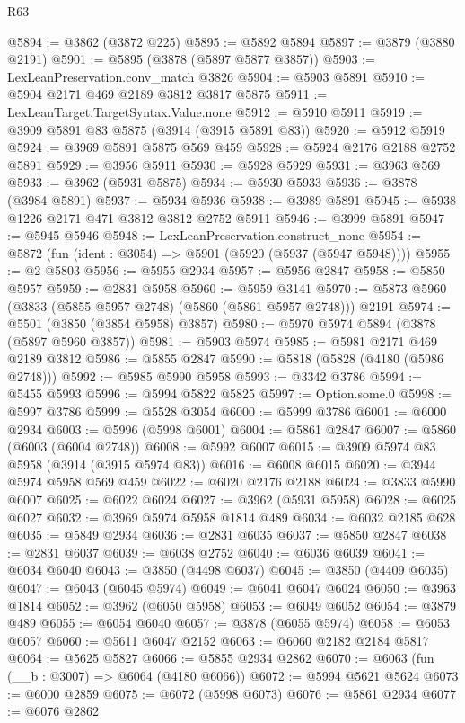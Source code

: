 \begin{lexlean}{R63}
\begin{coremodule}
@5894 := @3862 (@3872 @225)
@5895 := @5892 @5894
@5897 := @3879 (@3880 @2191)
@5901 := @5895 (@3878 (@5897 @5877 @3857))
@5903 := LexLeanPreservation.conv_match @3826
@5904 := @5903 @5891
@5910 := @5904 @2171 @469 @2189 @3812 @3817 @5875
@5911 := LexLeanTarget.TargetSyntax.Value.none
@5912 := @5910 @5911
@5919 := @3909 @5891 @83 @5875 (@3914 (@3915 @5891 @83))
@5920 := @5912 @5919
@5924 := @3969 @5891 @5875 @569 @459
@5928 := @5924 @2176 @2188 @2752 @5891
@5929 := @3956 @5911
@5930 := @5928 @5929
@5931 := @3963 @569
@5933 := @3962 (@5931 @5875)
@5934 := @5930 @5933
@5936 := @3878 (@3984 @5891)
@5937 := @5934 @5936
@5938 := @3989 @5891
@5945 := @5938 @1226 @2171 @471 @3812 @3812 @2752 @5911
@5946 := @3999 @5891
@5947 := @5945 @5946
@5948 := LexLeanPreservation.construct_none
@5954 := @5872 (fun (ident : @3054) => @5901 (@5920 (@5937 (@5947 @5948))))
@5955 := @2 @5803
@5956 := @5955 @2934
@5957 := @5956 @2847
@5958 := @5850 @5957
@5959 := @2831 @5958
@5960 := @5959 @3141
@5970 := @5873 @5960 (@3833 (@5855 @5957 @2748) (@5860 (@5861 @5957 @2748))) @2191
@5974 := @5501 (@3850 (@3854 @5958) @3857)
@5980 := @5970 @5974 @5894 (@3878 (@5897 @5960 @3857))
@5981 := @5903 @5974
@5985 := @5981 @2171 @469 @2189 @3812
@5986 := @5855 @2847
@5990 := @5818 (@5828 (@4180 (@5986 @2748)))
@5992 := @5985 @5990 @5958
@5993 := @3342 @3786
@5994 := @5455 @5993
@5996 := @5994 @5822 @5825
@5997 := Option.some.{0}
@5998 := @5997 @3786
@5999 := @5528 @3054
@6000 := @5999 @3786
@6001 := @6000 @2934
@6003 := @5996 (@5998 @6001)
@6004 := @5861 @2847
@6007 := @5860 (@6003 (@6004 @2748))
@6008 := @5992 @6007
@6015 := @3909 @5974 @83 @5958 (@3914 (@3915 @5974 @83))
@6016 := @6008 @6015
@6020 := @3944 @5974 @5958 @569 @459
@6022 := @6020 @2176 @2188
@6024 := @3833 @5990 @6007
@6025 := @6022 @6024
@6027 := @3962 (@5931 @5958)
@6028 := @6025 @6027
@6032 := @3969 @5974 @5958 @1814 @489
@6034 := @6032 @2185 @628
@6035 := @5849 @2934
@6036 := @2831 @6035
@6037 := @5850 @2847
@6038 := @2831 @6037
@6039 := @6038 @2752
@6040 := @6036 @6039
@6041 := @6034 @6040
@6043 := @3850 (@4498 @6037)
@6045 := @3850 (@4409 @6035)
@6047 := @6043 (@6045 @5974)
@6049 := @6041 @6047 @6024
@6050 := @3963 @1814
@6052 := @3962 (@6050 @5958)
@6053 := @6049 @6052
@6054 := @3879 @489
@6055 := @6054 @6040
@6057 := @3878 (@6055 @5974)
@6058 := @6053 @6057
@6060 := @5611 @6047 @2152
@6063 := @6060 @2182 @2184 @5817
@6064 := @5625 @5827
@6066 := @5855 @2934 @2862
@6070 := @6063 (fun (__b : @3007) => @6064 (@4180 @6066))
@6072 := @5994 @5621 @5624
@6073 := @6000 @2859
@6075 := @6072 (@5998 @6073)
@6076 := @5861 @2934
@6077 := @6076 @2862

\end{coremodule}
\end{lexlean}
